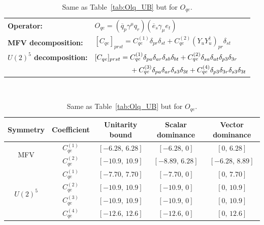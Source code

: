 \begin{table}[htbp]
\centering
{\small
\begin{tabular}{ll}
    \textbf{Operator:} &
        $\boxed{O_{qe} = (\overline q_p \gamma^\mu q_r)(\overline e_s \gamma_\mu e_t)}$ \\[0.2cm]
    \textbf{MFV decomposition:} &
        $[C_{qe}]_{prst} = C_{qe}^{(1)}\delta_{pr}\delta_{st} + C_{qe}^{(2)}(Y_u Y_u^\dagger)_{pr}\delta_{st}$ \\[0.15cm]
    \textbf{$U(2)^5$ decomposition:} &
        $[C_{qe}]_{prst} =
            C_{qe}^{(1)}\Pij{p}{r}{a}\Pij{s}{t}{b}
            + C_{qe}^{(2)}\Pij{s}{t}{a}\delta_{p3}\delta_{3r}$ \\
        & $\phantom{[C_{qe}]_{prst} ={}}+ C_{qe}^{(3)}\Pij{p}{r}{a}\delta_{s3}\delta_{3t}
            + C_{qe}^{(4)}\delta_{p3}\delta_{3r}\delta_{s3}\delta_{3t}$ \\
\end{tabular}
\\[0.3cm]
\renewcommand{\arraystretch}{1.3}
\begin{tabular}{ccccc}
    \toprule
    \rowcolor{hdrcolor}
    \textbf{Symmetry} & \textbf{Coefficient}
        & \textbf{Unitarity bound}
        & \textbf{Scalar dominance}
        & \textbf{Vector dominance} \\
    \midrule
    \multirow{2}{*}{MFV}
        & $C_{qe}^{(1)}$ & $[-6.28,\, 6.28]$  & $[-6.28,\, 0]$    & $[0,\, 6.28]$    \\
        & $C_{qe}^{(2)}$ & $[-10.9,\, 10.9]$  & $[-8.89,\, 6.28]$ & $[-6.28,\, 8.89]$ \\
    \midrule
    \multirow{4}{*}{$U(2)^5$}
        & $C_{qe}^{(1)}$ & $[-7.70,\, 7.70]$ & $[-7.70,\, 0]$ & $[0,\, 7.70]$ \\
        & $C_{qe}^{(2)}$ & $[-10.9,\, 10.9]$ & $[-10.9,\, 0]$ & $[0,\, 10.9]$ \\
        & $C_{qe}^{(3)}$ & $[-10.9,\, 10.9]$ & $[-10.9,\, 0]$ & $[0,\, 10.9]$ \\
        & $C_{qe}^{(4)}$ & $[-12.6,\, 12.6]$ & $[-12.6,\, 0]$ & $[0,\, 12.6]$ \\
    \bottomrule
\end{tabular}}
\caption{Same as Table~\ref{tab:Olq_UB} but for $O_{qe}$.}
\label{tab:Oqe_UB}
\end{table}

